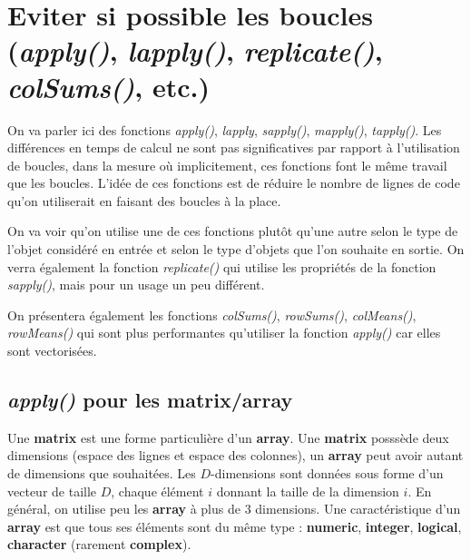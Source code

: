 \documentclass[
]{book}
\theoremstyle{definition}
\theoremstyle{definition}
\theoremstyle{definition}
\theoremstyle{definition}
\theoremstyle{remark}
\begin{document}
\hypertarget{eviter-si-possible-les-boucles-apply-lapply-replicate-colsums-etc.}{%
\section{\texorpdfstring{Eviter si possible les boucles (\emph{apply()}, \emph{lapply()}, \emph{replicate()}, \emph{colSums()}, etc.)}{Eviter si possible les boucles (apply(), lapply(), replicate(), colSums(), etc.)}}\label{eviter-si-possible-les-boucles-apply-lapply-replicate-colsums-etc.}}

On va parler ici des fonctions \emph{apply()}, \emph{lapply}, \emph{sapply()}, \emph{mapply()}, \emph{tapply()}. Les différences en temps de calcul ne sont pas significatives par rapport à l'utilisation de boucles, dans la mesure où implicitement, ces fonctions font le même travail que les boucles. L'idée de ces fonctions est de réduire le nombre de lignes de code qu'on utiliserait en faisant des boucles à la place.

On va voir qu'on utilise une de ces fonctions plutôt qu'une autre selon le type de l'objet considéré en entrée et selon le type d'objets que l'on souhaite en sortie. On verra également la fonction \emph{replicate()} qui utilise les propriétés de la fonction \emph{sapply()}, mais pour un usage un peu différent.

On présentera également les fonctions \emph{colSums()}, \emph{rowSums()}, \emph{colMeans()}, \emph{rowMeans()} qui sont plus performantes qu'utiliser la fonction \emph{apply()} car elles sont vectorisées.

\hypertarget{apply-pour-les-matrixarray}{%
\subsection{\texorpdfstring{\emph{apply()} pour les \textbf{matrix/array}}{apply() pour les matrix/array}}\label{apply-pour-les-matrixarray}}

Une \textbf{matrix} est une forme particulière d'un \textbf{array}. Une \textbf{matrix} posssède deux dimensions (espace des lignes et espace des colonnes), un \textbf{array} peut avoir autant de dimensions que souhaitées. Les \(D\)-dimensions sont données sous forme d'un vecteur de taille \(D\), chaque élément \(i\) donnant la taille de la dimension \(i\). En général, on utilise peu les \textbf{array} à plus de 3 dimensions. Une caractéristique d'un \textbf{array} est que tous ses éléments sont du même type : \textbf{numeric}, \textbf{integer}, \textbf{logical}, \textbf{character} (rarement \textbf{complex}).
\end{document}

